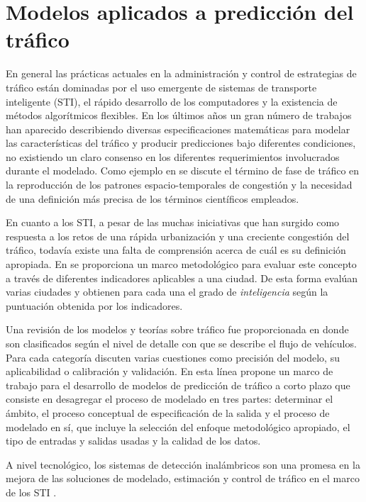 \documentclass{llncs}
\begin{document}
\section{Modelos aplicados a predicción del tráfico}

En general las prácticas actuales en la administración y control de estrategias de tráfico están dominadas por el uso emergente de sistemas de transporte inteligente (STI), el rápido desarrollo de los computadores y la existencia de métodos algorítmicos flexibles. En los últimos años un gran número de trabajos han aparecido describiendo diversas especificaciones matemáticas para modelar las características del tráfico y producir predicciones bajo diferentes condiciones, no existiendo un claro consenso en los diferentes requerimientos involucrados durante el modelado.  Como ejemplo en \cite{Treiber2010983} se discute el término de fase de tráfico en la reproducción de los patrones espacio-temporales de congestión y la necesidad de una definición más precisa de los términos científicos empleados. 

En cuanto a los STI, a pesar de las muchas iniciativas que han surgido como respuesta a los retos de una rápida urbanización y una creciente congestión del tráfico, todavía existe una falta de comprensión acerca de cuál es su definición apropiada. En \cite{Debnath201447} se proporciona un marco metodológico para evaluar este concepto a través de diferentes indicadores aplicables a una ciudad. De esta forma evalúan varias ciudades y obtienen para cada una el grado de \emph{inteligencia} según la puntuación obtenida por los indicadores.

Una revisión de los modelos y teorías sobre tráfico fue proporcionada en \cite{Hoogendoorn2001283} donde son clasificados según el nivel de detalle con que se describe el flujo de vehículos. Para cada categoría discuten varias cuestiones como precisión del modelo, su aplicabilidad o calibración y validación.  En esta línea \cite{Vlahogianni2004533} propone un marco de trabajo para el desarrollo de modelos de predicción de tráfico a corto plazo que consiste en desagregar el proceso de modelado en tres partes: determinar el ámbito, el proceso conceptual de especificación de la salida y el proceso de modelado en sí, que incluye la selección del enfoque metodológico apropiado, el tipo de entradas y salidas usadas y la calidad de los datos.

A nivel tecnológico, los sistemas de detección inalámbricos son una promesa en la mejora de las soluciones de modelado, estimación y control de tráfico en el marco de los STI \cite{tubaishat2009wireless}. 
\end{document}
